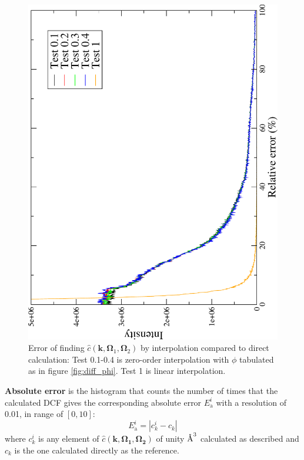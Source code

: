\begin{figure}[h]
\begin{minipage}[t]{1\textwidth}
\begin{center}
\includegraphics[angle=-90,scale=0.35]{_figure/c_local_to_global_coordinates_32_96/relative_error}
\par\end{center}
\caption[Error of finding $\hat{c}(\mathbf{k},\mathbf{\Omega}_{1},\mathbf{\Omega}_{2})$
by interpolation]{Error of finding $\hat{c}(\mathbf{k},\mathbf{\Omega}_{1},\mathbf{\Omega}_{2})$
by interpolation compared to direct calculation: Test 0.1-0.4 is zero-order
interpolation with $\phi$ tabulated as in figure \ref{fig:diff_phi}.
Test 1 is linear interpolation.\label{fig:error}}
%
\end{minipage}
\end{figure}

\textbf{Absolute error} is the histogram that counts the number of
times that the calculated \acs{DCF} gives the corresponding absolute
error $E_{\mathrm{a}}^{i}$ with a resolution of 0.01, in range of
$[0,10]$:
\begin{equation}
E_{\mathrm{a}}^{i}=\left|c_{k}^{i}-c_{k}\right|
\end{equation}
where $c_{k}^{i}$ is any element of $\hat{c}(\mathbf{k},\mathbf{\Omega_{1}},\mathbf{\Omega_{2}})$
of unity $\lyxmathsym{\AA}^{3}$ calculated as described and $c_{k}$
is the one calculated directly as the reference.

